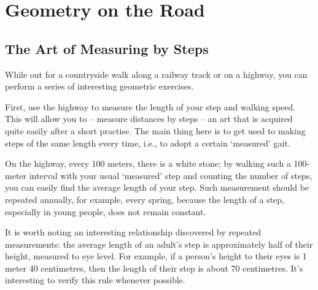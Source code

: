 

\chapter{Geometry on the Road}
\label{ch-04}

\section{The Art of Measuring by Steps}
\label{sec-4.1}


While out for a countryside walk along a railway track or on a highway, you can perform a series of interesting geometric exercises.

First, use the highway to measure the length of your step and walking speed. This will allow you to -- measure distances by steps -- an art that is acquired quite easily after a short practise. The main thing here is to get used to making steps of the same length every time, i.e., to adopt a certain `measured' gait.

On the highway, every 100 meters, there is a white stone; by walking such a 100-meter interval with your usual `measured' step and counting the number of steps, you can easily find the average length of your step. Such measurement should be repeated annually, for example, every spring, because the length of a step, especially in young people, does not remain constant.

It is worth noting an interesting relationship discovered by repeated measurements: the average length of an adult's step is approximately half of their height, measured to eye level. For example, if a person's height to their eyes is 1 meter 40 centimetres, then the length of their step is about 70 centimetres. It's interesting to verify this rule whenever possible.

